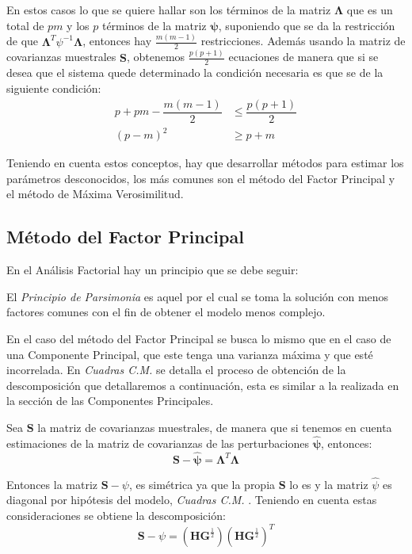 \noindent En estos casos lo que se quiere hallar son los términos de la matriz $\mathbf{\Lambda}$ que es un total de $pm$ y los $p$ términos de la matriz $\mathbf{\psi}$, suponiendo que se da la restricción de que $\mathbf{\Lambda}^T \psi^{-1}\mathbf{\Lambda}$, entonces hay $\frac{m(m-1)}{2}$ restricciones. Además usando la matriz de covarianzas muestrales $\textbf{S}$, obtenemos $\frac{p(p+1)}{2}$ ecuaciones de manera que si se desea que el sistema quede  determinado la condición necesaria es que se de la siguiente condición:
\begin{equation}
\begin{split}
p+pm-\dfrac{m(m-1)}{2}&\leq\dfrac{p(p+1)}{2}\\
(p-m)^2&\geq p+m
\end{split} 
\end{equation} 

\noindent Teniendo en cuenta estos conceptos, hay que desarrollar métodos para estimar los parámetros desconocidos, los más comunes son el método del Factor Principal y el método de Máxima Verosimilitud.


\subsection{Método del Factor Principal}

\noindent En el Análisis Factorial hay un principio que se debe seguir:
\begin{defi}
El \emph{Principio de Parsimonia} es aquel por el cual se toma la solución con menos factores comunes con el fin de obtener el modelo menos complejo. 
\end{defi}

\noindent En el caso del método del Factor Principal se busca lo mismo que en el caso de una Componente Principal, que este tenga una varianza máxima y que esté incorrelada. En \emph{Cuadras C.M.}\cite{Cuadras 2014} se detalla el proceso de obtención de la descomposición que detallaremos a continuación, esta es similar a la realizada en la sección de las Componentes Principales. 

\noindent Sea $\mathbf{S}$ la matriz de covarianzas muestrales, de manera que si tenemos en cuenta estimaciones de la matriz de covarianzas de las perturbaciones $\mathbf{\hat{\psi}}$, entonces: 
\begin{equation}
\mathbf{S}-\mathbf{\hat{\psi}}=\mathbf{\Lambda}^T\mathbf{\Lambda}
\end{equation}

\noindent Entonces la matriz $\textbf{S}-\psi$, es simétrica ya que la propia $\textbf{S}$ lo es y la matriz $\hat{\psi}$ es diagonal por hipótesis del modelo, \emph{Cuadras C.M.} \cite{Cuadras 2014}. Teniendo en cuenta estas consideraciones se obtiene la descomposición:
\begin{equation}
\textbf{S}-\psi=(\textbf{HG}^{\frac{1}{2}})(\textbf{HG}^{\frac{1}{2}})^T
\end{equation}


